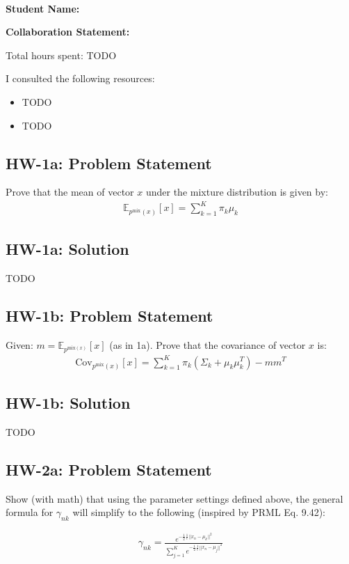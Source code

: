\documentclass[10pt]{article}
\newcommand{\officialdirections}[1]{{\color{blue} #1}}
\begin{document}
~~\\ %
\Large{\bf Student Name:}

\Large{\bf Collaboration Statement:}

Total hours spent: TODO

I consulted the following resources:
\begin{itemize}
\item TODO
\item TODO
\end{itemize}

\tableofcontents


\newpage
\officialdirections{
\subsection*{HW-1a: Problem Statement}
Prove that the mean of vector $x$ under the mixture distribution is given by:
\begin{align}
\mathbb{E}_{p^{\text{mix}}(x)}[x] = \sum_{k=1}^K \pi_k \mu_k
\end{align}
}

\subsection{HW-1a: Solution}
TODO

\newpage
\officialdirections{
\subsection*{HW-1b: Problem Statement}
Given: $m = \mathbb{E}_{p^{\text{mix}(x)}}[x]$ (as in 1a).
Prove that the covariance of vector $x$ is:
\begin{align}
\text{Cov}_{p^{\text{mix}}(x)}[x] = \sum_{k=1}^K \pi_k (\Sigma_k + \mu_k \mu_k^T ) - m m^T
\end{align}
}
\subsection{HW-1b: Solution}
TODO
 
 
\newpage
\officialdirections{
\subsection*{HW-2a: Problem Statement}
Show (with math) that using the parameter settings defined above, the general formula for $\gamma_{nk}$ will simplify to the following (inspired by PRML Eq. 9.42):

\begin{align}
	\gamma_{nk} = \frac
	{  e^{ -\frac{1}{2} \frac{1}{\epsilon} || x_n - \mu_k ||^2 } }
	{ \sum_{j=1}^K e^{ -\frac{1}{2} \frac{1}{\epsilon} || x_n - \mu_j ||^2 }}
\end{align}
}
\end{document}
